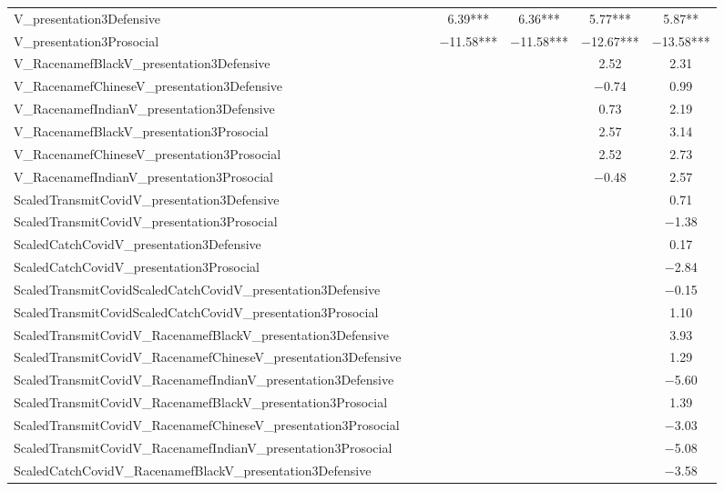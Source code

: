 \documentclass[]{report}
\begin{document}
\begin{table}
{\begin{tabular}[t]{lcccccc}
		V\_presentation3Defensive &  &  & \num{6.39}*** & \num{6.36}*** & \num{5.77}*** & \num{5.87}**\\
		V\_presentation3Prosocial &  &  & \num{-11.58}*** & \num{-11.58}*** & \num{-12.67}*** & \num{-13.58}***\\
		V\_RacenamefBlackV\_presentation3Defensive &  &  &  &  & \num{2.52} & \num{2.31}\\
		V\_RacenamefChineseV\_presentation3Defensive &  &  &  &  & \num{-0.74} & \num{0.99}\\
		V\_RacenamefIndianV\_presentation3Defensive &  &  &  &  & \num{0.73} & \num{2.19}\\
		V\_RacenamefBlackV\_presentation3Prosocial &  &  &  &  & \num{2.57} & \num{3.14}\\
		V\_RacenamefChineseV\_presentation3Prosocial &  &  &  &  & \num{2.52} & \num{2.73}\\
		V\_RacenamefIndianV\_presentation3Prosocial &  &  &  &  & \num{-0.48} & \num{2.57}\\
		ScaledTransmitCovidV\_presentation3Defensive &  &  &  &  &  & \num{0.71}\\
		ScaledTransmitCovidV\_presentation3Prosocial &  &  &  &  &  & \num{-1.38}\\
		ScaledCatchCovidV\_presentation3Defensive &  &  &  &  &  & \num{0.17}\\
		ScaledCatchCovidV\_presentation3Prosocial &  &  &  &  &  & \num{-2.84}\\
		ScaledTransmitCovidScaledCatchCovidV\_presentation3Defensive &  &  &  &  &  & \num{-0.15}\\
		ScaledTransmitCovidScaledCatchCovidV\_presentation3Prosocial &  &  &  &  &  & \num{1.10}\\
		ScaledTransmitCovidV\_RacenamefBlackV\_presentation3Defensive &  &  &  &  &  & \num{3.93}\\
		ScaledTransmitCovidV\_RacenamefChineseV\_presentation3Defensive &  &  &  &  &  & \num{1.29}\\
		ScaledTransmitCovidV\_RacenamefIndianV\_presentation3Defensive &  &  &  &  &  & \num{-5.60}\\
		ScaledTransmitCovidV\_RacenamefBlackV\_presentation3Prosocial &  &  &  &  &  & \num{1.39}\\
		ScaledTransmitCovidV\_RacenamefChineseV\_presentation3Prosocial &  &  &  &  &  & \num{-3.03}\\
		ScaledTransmitCovidV\_RacenamefIndianV\_presentation3Prosocial &  &  &  &  &  & \num{-5.08}\\
		ScaledCatchCovidV\_RacenamefBlackV\_presentation3Defensive &  &  &  &  &  & \num{-3.58}\\

\end{tabular}}
\end{table}
\end{document}
